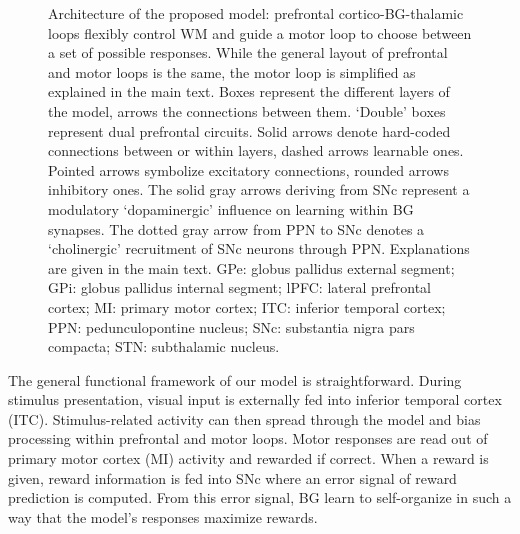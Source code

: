 \documentclass[
  11pt,
  a4paper,
]{scrbook}
\begin{document}
\begin{figure}


\caption{\label{fig-nn:fig1}Architecture of the proposed model:
prefrontal cortico-BG-thalamic loops flexibly control WM and guide a
motor loop to choose between a set of possible responses. While the
general layout of prefrontal and motor loops is the same, the motor loop
is simplified as explained in the main text. Boxes represent the
different layers of the model, arrows the connections between them.
`Double' boxes represent dual prefrontal circuits. Solid arrows denote
hard-coded connections between or within layers, dashed arrows learnable
ones. Pointed arrows symbolize excitatory connections, rounded arrows
inhibitory ones. The solid gray arrows deriving from SNc represent a
modulatory `dopaminergic' influence on learning within BG synapses. The
dotted gray arrow from PPN to SNc denotes a `cholinergic' recruitment of
SNc neurons through PPN. Explanations are given in the main text. GPe:
globus pallidus external segment; GPi: globus pallidus internal segment;
lPFC: lateral prefrontal cortex; MI: primary motor cortex; ITC: inferior
temporal cortex; PPN: pedunculopontine nucleus; SNc: substantia nigra
pars compacta; STN: subthalamic nucleus.}

\end{figure}%

The general functional framework of our model is straightforward. During
stimulus presentation, visual input is externally fed into inferior
temporal cortex (ITC). Stimulus-related activity can then spread through
the model and bias processing within prefrontal and motor loops. Motor
responses are read out of primary motor cortex (MI) activity and
rewarded if correct. When a reward is given, reward information is fed
into SNc where an error signal of reward prediction is computed. From
this error signal, BG learn to self-organize in such a way that the
model's responses maximize rewards.
\end{document}
